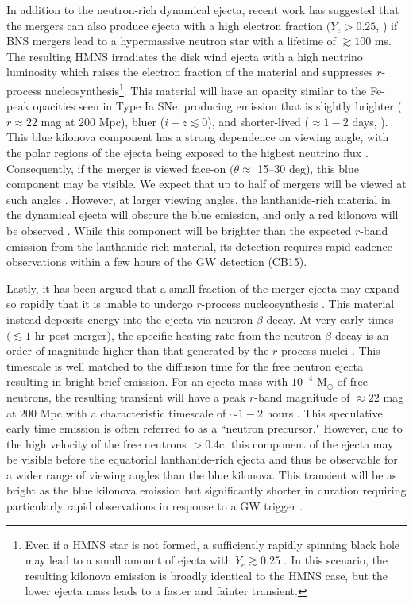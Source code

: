 In addition to the neutron-rich dynamical ejecta, recent work has suggested that the mergers can also produce ejecta with a high electron fraction $(Y_e > 0.25$,  \citealt{Wanajo+14,Goriely+15}) if BNS mergers lead to a hypermassive neutron star \citep[HMNS; see e.g.,][]{Sekiguchi+11} with a lifetime of $\gtrsim 100$ ms. The resulting HMNS irradiates the disk wind ejecta with a high neutrino luminosity which raises the electron fraction of the material and suppresses $r$-process nucleosynthesis\footnote{\singlespace Even if a HMNS star is not formed, a sufficiently rapidly spinning black hole may lead to a small amount of ejecta with $Y_e \gtrsim 0.25$ \citep[see e.g.,][]{FernandezMetzger13,Fernandez+15}. In this scenario, the resulting kilonova emission is broadly identical to the HMNS case, but the lower ejecta mass leads to a faster and fainter transient.}. This material will have an opacity similar to the Fe-peak opacities seen in Type Ia SNe, producing emission that is slightly brighter ($r \approx 22$ mag at 200 Mpc), bluer ($i-z \lesssim 0$), and shorter-lived ($\approx 1-2$ days, \citealt{MetzgerFernandez14,Kasen+15}). This blue kilonova component has a strong dependence on viewing angle, with the polar regions of the ejecta being exposed to the highest neutrino flux \citep{MetzgerFernandez14,Kasen+15}. Consequently, if the merger is viewed face-on $(\theta \approx$ 15--30 deg), this blue component may be visible. We expect that up to half of mergers will be viewed at such angles \citep[see e.g.,][]{MetzgerBerger12}. However, at larger viewing angles, the lanthanide-rich material in the dynamical ejecta will obscure the blue emission, and only a red kilonova will be observed \citep{Kasen+15,Metzger2017}. While this component will be brighter than the expected $r$-band emission from the lanthanide-rich material, its detection requires rapid-cadence observations within a few hours of the GW detection (CB15).

Lastly, it has been argued that a small fraction of the merger ejecta may expand so rapidly that it is unable to undergo $r$-process nucleosynthesis \citep{Bauswein+13a}. This material instead deposits energy into the ejecta via neutron $\beta$-decay. At very early times $(\lesssim 1$ hr post merger), the specific heating rate from the neutron $\beta$-decay is an order of magnitude higher than that generated by the $r$-process nuclei \citep{Metzger2017}. This timescale is well matched to the diffusion time for the free neutron ejecta resulting in bright brief emission. For an ejecta mass with $10^{-4}$ M$_{\odot}$ of free neutrons, the resulting transient will have a peak $r$-band magnitude of $\approx 22$ mag at 200 Mpc with a characteristic timescale of $\sim 1-2$ hours \citep{Metzger+15}. This speculative early time emission is often referred to as a ``neutron precursor." However, due to the high velocity of the free neutrons $>0.4$c, this component of the ejecta may be visible before the equatorial lanthanide-rich ejecta and thus be observable for a wider range of viewing angles than the blue kilonova. This transient will be as bright as the blue kilonova emission but significantly shorter in duration requiring particularly rapid observations in response to a GW trigger .


